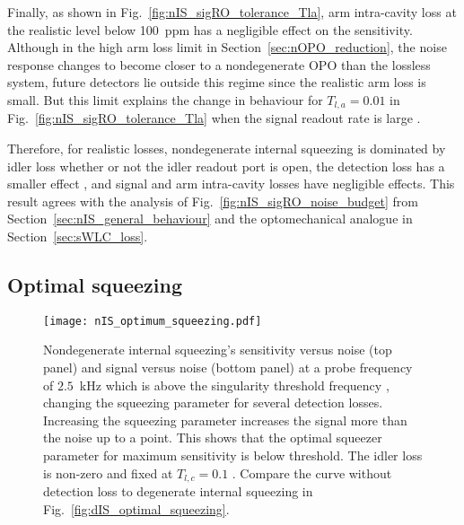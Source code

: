 Finally, as shown in Fig.~\ref{fig:nIS_sigRO_tolerance_Tla}, arm intra-cavity loss at the realistic level below 100~ppm has a negligible  effect on the sensitivity. Although in the high arm loss limit in Section~\ref{sec:nOPO_reduction}, the noise response changes to become closer to a nondegenerate OPO than the lossless system, future detectors lie outside this regime since the realistic arm loss is small. 
But this limit explains the change in behaviour for $T_{l,a}=0.01$  in Fig.~\ref{fig:nIS_sigRO_tolerance_Tla} when the signal readout rate is large .

Therefore, for realistic losses, nondegenerate internal squeezing is dominated by idler loss whether or not the idler readout port is open, the detection loss has a smaller effect , and signal and arm intra-cavity losses have negligible effects. This result agrees with the analysis of Fig.~\ref{fig:nIS_sigRO_noise_budget} from Section~\ref{sec:nIS_general_behaviour}  and the optomechanical analogue in Section~\ref{sec:sWLC_loss}.


\subsection{Optimal squeezing}
\label{sec:nIS_optimal_squeezing}

\begin{figure}
	\centering
	\texttt{[image: nIS\_optimum\_squeezing.pdf]}
	\caption{  Nondegenerate internal squeezing's sensitivity versus noise (top panel) and signal versus noise (bottom panel) at a probe frequency of $2.5$~kHz which is above the singularity threshold frequency , changing the squeezing parameter for several detection losses. Increasing the squeezing parameter increases the signal more than the noise up to a point. This shows that the optimal squeezer parameter for maximum sensitivity is below threshold. The idler loss is non-zero and fixed at $T_{l,c}=0.1$ . Compare the curve without detection loss to degenerate internal squeezing in Fig.~\ref{fig:dIS_optimal_squeezing}.}
	\label{fig:nIS_optimum_squeezing}
\end{figure}

